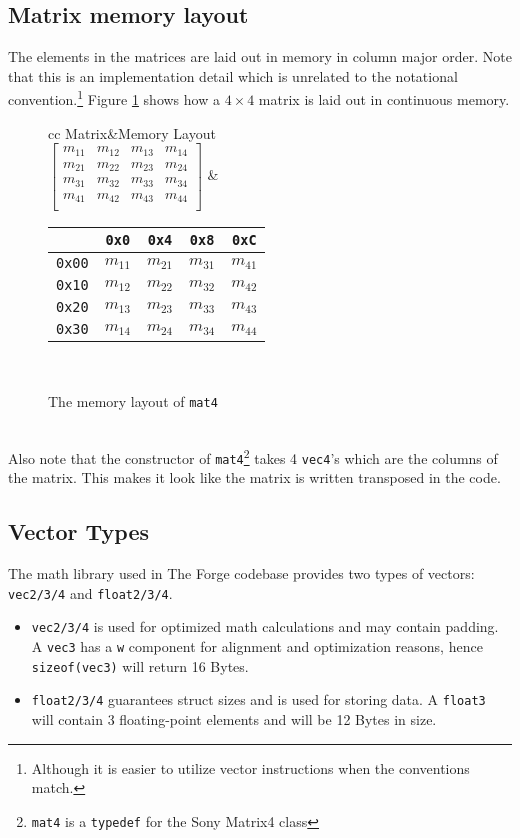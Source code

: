\documentclass{article}
\newcommand{\BuildMat}[1]{\left[\begin{matrix}#1\end{matrix}\right]}
\let\lstInline\lstinline %
\newcommand{\InlCode}[1]{\lstInline[basicstyle=\ttfamily]{#1}}
\begin{document}
\subsection{Matrix memory layout}
The elements in the matrices are laid out in memory in column major order.
Note that this is an implementation detail which is unrelated to the notational convention.\footnote{Although it is easier to utilize vector instructions when the conventions match.}
Figure \ref{tabular:mat4MemoryLayout} shows how a $4\times 4$ matrix is laid out in continuous memory.\\
\begin{figure}[b]
\centering
\begin{tabular}{cc}
Matrix&Memory Layout\\
$
\BuildMat{
m_{11}&m_{12}&m_{13}&m_{14}\\
m_{21}&m_{22}&m_{23}&m_{24}\\
m_{31}&m_{32}&m_{33}&m_{34}\\
m_{41}&m_{42}&m_{43}&m_{44}\\
}
$
&
\begin{tabular}{|c|c|c|c|c|}
\hline
&\texttt{0x0}&\texttt{0x4}&\texttt{0x8}&\texttt{0xC}\\
\hline
\texttt{0x00}&$m_{11}$&$m_{21}$&$m_{31}$&$m_{41}$\\
\hline
\texttt{0x10}&$m_{12}$&$m_{22}$&$m_{32}$&$m_{42}$\\
\hline
\texttt{0x20}&$m_{13}$&$m_{23}$&$m_{33}$&$m_{43}$\\
\hline
\texttt{0x30}&$m_{14}$&$m_{24}$&$m_{34}$&$m_{44}$\\
\hline
\end{tabular}
\\
\end{tabular}
\caption{The memory layout of \InlCode{mat4}}
\label{tabular:mat4MemoryLayout}
\end{figure}
\\Also note that the constructor of \InlCode{mat4}\footnote{\InlCode{mat4} is a \InlCode{typedef} for the Sony Matrix4 class} takes 4 \InlCode{vec4}'s which are the columns of the matrix.
This makes it look like the matrix is written transposed in the code.

\subsection{Vector Types}
The math library used in The Forge codebase provides two types of vectors: \InlCode{vec2/3/4} and \InlCode{float2/3/4}.
\begin{itemize}
	\item \InlCode{vec2/3/4} is used for optimized math calculations and may contain padding. A \InlCode{vec3} has a \InlCode{w} component for alignment and optimization reasons, hence \InlCode{sizeof(vec3)} will return 16 Bytes.
	\item \InlCode{float2/3/4} guarantees struct sizes and is used for storing data. A \InlCode{float3} will contain 3 floating-point elements and will be 12 Bytes in size.
\end{itemize}
\end{document}
